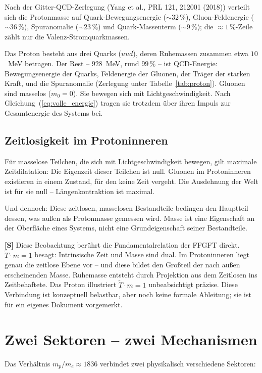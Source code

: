 \noindent Nach der Gitter-QCD-Zerlegung (Yang et al., PRL 121, 212001
(2018)) verteilt sich die Protonmasse auf Quark-Bewegungsenergie
($\sim 32\,\%$), Gluon-Feldenergie ($\sim 36\,\%$), Spuranomalie
($\sim 23\,\%$) und Quark-Massenterm ($\sim 9\,\%$); die
$\approx 1\,\%$-Zeile zählt nur die Valenz-Stromquarkmassen.

Das Proton besteht aus drei Quarks ($uud$), deren Ruhemassen zusammen
etwa $10$~MeV betragen. Der Rest -- $928$~MeV, rund $99\,\%$ -- ist
QCD-Energie: Bewegungsenergie der Quarks, Feldenergie der Gluonen, der
Träger der starken Kraft, und die Spuranomalie
(Zerlegung unter Tabelle~\ref{tab:proton}). Gluonen sind masselos
($m_0 = 0$). Sie bewegen sich mit Lichtgeschwindigkeit. Nach
Gleichung~(\ref{eq:volle_energie}) tragen sie trotzdem über ihren
Impuls zur Gesamtenergie des Systems bei.

\subsection{Zeitlosigkeit im Protoninneren}

Für masselose Teilchen, die sich mit Lichtgeschwindigkeit bewegen,
gilt maximale Zeitdilatation: Die Eigenzeit dieser Teilchen ist null.
Gluonen im Protoninneren existieren in einem Zustand, für den keine
Zeit vergeht. Die Ausdehnung der Welt ist für sie null --
Längenkontraktion ist maximal.

Und dennoch: Diese zeitlosen, masselosen Bestandteile bedingen den
Hauptteil dessen, was außen als Protonmasse gemessen wird. Masse ist
eine Eigenschaft an der Oberfläche eines Systems, nicht eine Grundeigenschaft
seiner Bestandteile.

\textbf{[S]} Diese Beobachtung berührt die Fundamentalrelation der
FFGFT direkt. $\tilde{T} \cdot m = 1$ besagt: Intrinsische Zeit und
Masse sind dual. Im Protoninneren liegt genau die zeitlose Ebene vor --
und diese bildet den Großteil der nach außen erscheinenden Masse.
Ruhemasse entsteht durch Projektion aus dem Zeitlosen ins Zeitbehaftete.
Das Proton illustriert $\tilde{T} \cdot m = 1$ unbeabsichtigt präzise.
Diese Verbindung ist konzeptuell belastbar, aber noch keine formale
Ableitung; sie ist für ein eigenes Dokument vorgemerkt.

\section{Zwei Sektoren -- zwei Mechanismen}

Das Verhältnis $m_p/m_e \approx 1836$ verbindet zwei physikalisch
verschiedene Sektoren:

